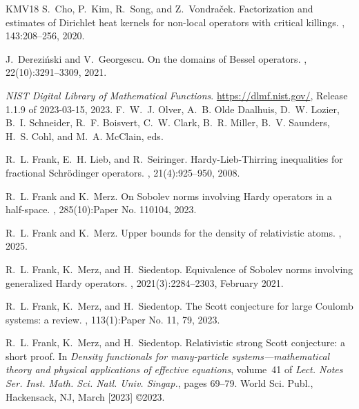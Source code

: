 \documentclass[12pt,reqno]{amsart}
\theoremstyle{definition}
\theoremstyle{remark}
\numberwithin{equation}{section}
\newcommand{\1}{\mathbbm{1}}
\begin{document}
\begin{thebibliography}{KMV{\etalchar{+}}18}
S.~Cho, P.~Kim, R.~Song, and Z.~Vondra\v{c}ek.
\newblock Factorization and estimates of {D}irichlet heat kernels for non-local
  operators with critical killings.
, 143:208--256, 2020.

J.~Derezi\'{n}ski and V.~Georgescu.
\newblock On the domains of {B}essel operators.
, 22(10):3291--3309, 2021.

{\it NIST Digital Library of Mathematical Functions}.
\newblock \url{https://dlmf.nist.gov/}, Release 1.1.9 of 2023-03-15, 2023.
\newblock F.~W.~J. Olver, A.~B. {Olde Daalhuis}, D.~W. Lozier, B.~I. Schneider,
  R.~F. Boisvert, C.~W. Clark, B.~R. Miller, B.~V. Saunders, H.~S. Cohl, and
  M.~A. McClain, eds.

R.~L. Frank, E.~H. Lieb, and R.~Seiringer.
\newblock Hardy-{L}ieb-{T}hirring inequalities for fractional {S}chr\"odinger
  operators.
, 21(4):925--950, 2008.

R.~L. Frank and K.~Merz.
\newblock On {S}obolev norms involving {H}ardy operators in a half-space.
, 285(10):Paper No. 110104, 2023.

R.~L. Frank and K.~Merz.
\newblock Upper bounds for the density of relativistic atoms.
, 2025.

R.~L. Frank, K.~Merz, and H.~Siedentop.
\newblock Equivalence of {S}obolev norms involving generalized {H}ardy
  operators.
, 2021(3):2284--2303,
  February 2021.

R.~L. Frank, K.~Merz, and H.~Siedentop.
\newblock The {S}cott conjecture for large {C}oulomb systems: a review.
, 113(1):Paper No. 11, 79, 2023.

R.~L. Frank, K.~Merz, and H.~Siedentop.
\newblock Relativistic strong {S}cott conjecture: a short proof.
\newblock In {\em Density functionals for many-particle systems---mathematical
  theory and physical applications of effective equations}, volume~41 of {\em
  Lect. Notes Ser. Inst. Math. Sci. Natl. Univ. Singap.}, pages 69--79. World
  Sci. Publ., Hackensack, NJ, March [2023] \copyright 2023.


\end{thebibliography}
\end{document}
